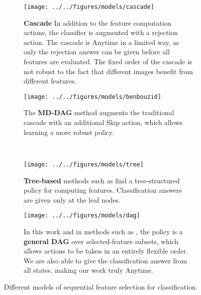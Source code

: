 \begin{figure}[h!]
\centering
\begin{subfigure}[b]{0.48\linewidth}
    \texttt{[image: ../../figures/models/cascade]}
    \caption{
\textbf{Cascade}
In addition to the feature computation actions, the classifier is augmented with a rejection action.
The cascade is Anytime in a limited way, as only the rejection answer can be given before all features are evaluated.
The fixed order of the cascade is not robust to the fact that different images benefit from different features.
}
\end{subfigure}\hfill%
\begin{subfigure}[b]{0.48\linewidth}
    \texttt{[image: ../../figures/models/benbouzid]}
    \caption{
The \textbf{MD-DAG} method \parencite{Benbouzid-ICML-2012} augments the traditional cascade with an additional Skip action, which allows learning a more robust policy.
}
\end{subfigure}\\
\begin{subfigure}[b]{0.48\linewidth}
    \texttt{[image: ../../figures/models/tree]}
    \caption{
\textbf{Tree-based} methods such as \cite{Xu-ICML-2012} find a tree-structured policy for computing features.
Classification answers are given only at the leaf nodes.
    }
\end{subfigure}\hfill%
\begin{subfigure}[b]{0.48\linewidth}
    \texttt{[image: ../../figures/models/dag]}
    \caption{
In this work and in methods such as \cite{Gao-NIPS-2011}, the policy is a \textbf{general DAG} over selected-feature subsets, which allows actions to be taken in an entirely flexible order.
We are also able to give the classification answer from all states, making our work truly Anytime.
    }
\end{subfigure}
\caption{
Different models of sequential feature selection for classification.
}\label{fig:models}
\end{figure}
